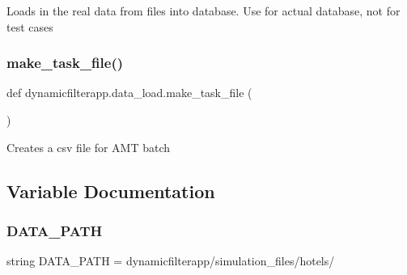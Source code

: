 \begin{DoxyVerb}Loads in the real data from files into database. Use for actual database, not for test cases
\end{DoxyVerb}
 \mbox{\label{namespacedynamicfilterapp_1_1data__load_a7e72a65e3908f5494f6118d9f0fedf6a}} 
\subsubsection{\texorpdfstring{make\_task\_file()}{make\_task\_file()}}
{\footnotesize\ttfamily def dynamicfilterapp.\+data\+\_\+load.\+make\+\_\+task\+\_\+file (\begin{DoxyParamCaption}{ }\end{DoxyParamCaption})}

\begin{DoxyVerb}Creates a csv file for AMT batch
\end{DoxyVerb}
 

\subsection{Variable Documentation}
\mbox{\label{namespacedynamicfilterapp_1_1data__load_a0ac46f24cb77c7bc3fea18f76f727cdb}} 
\subsubsection{\texorpdfstring{DATA\_PATH}{DATA\_PATH}}
{\footnotesize\ttfamily string D\+A\+T\+A\+\_\+\+P\+A\+TH = \textquotesingle{}dynamicfilterapp/simulation\+\_\+files/hotels/\textquotesingle{}}

